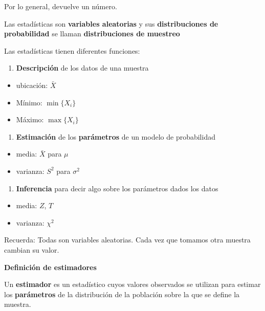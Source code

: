 \documentclass[
]{book}
\providecommand{\tightlist}{%
  \setlength{\itemsep}{0pt}\setlength{\parskip}{0pt}}
\begin{document}
Por lo general, devuelve un número.

Las estadísticas son \textbf{variables aleatorias} y sus \textbf{distribuciones de probabilidad} se llaman \textbf{distribuciones de muestreo}

Las estadísticas tienen diferentes funciones:

\begin{enumerate}
\def\labelenumi{\arabic{enumi}.}
\tightlist
\item
  \textbf{Descripción} de los datos de una muestra
\end{enumerate}

\begin{itemize}
\tightlist
\item
  ubicación: \(\bar{X}\)
\item
  Mínimo: \(\min\{X_i\}\)
\item
  Máximo: \(\max\{X_i\}\)
\end{itemize}

\begin{enumerate}
\def\labelenumi{\arabic{enumi}.}
\setcounter{enumi}{1}
\tightlist
\item
  \textbf{Estimación} de los \textbf{parámetros} de un modelo de probabilidad
\end{enumerate}

\begin{itemize}
\tightlist
\item
  media: \(\bar{X}\) para \(\mu\)
\item
  varianza: \(S^2\) para \(\sigma^2\)
\end{itemize}

\begin{enumerate}
\def\labelenumi{\arabic{enumi}.}
\setcounter{enumi}{2}
\tightlist
\item
  \textbf{Inferencia} para decir algo sobre los parámetros dados los datos
\end{enumerate}

\begin{itemize}
\tightlist
\item
  media: \(Z\), \(T\)
\item
  varianza: \(\chi^2\)
\end{itemize}

Recuerda: Todas son variables aleatorias. Cada vez que tomamos otra muestra cambian su valor.

\textbf{Definición de estimadores}

Un \textbf{estimador} es un estadístico cuyos valores observados se utilizan para estimar los \textbf{parámetros} de la distribución de la población sobre la que se define la muestra.
\end{document}
